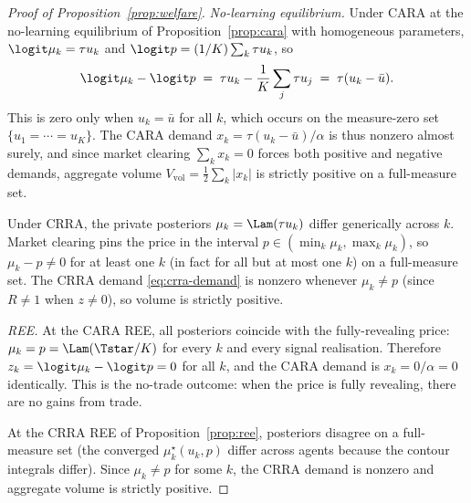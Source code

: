 \begin{proof}[Proof of Proposition~\ref{prop:welfare}]
\emph{No-learning equilibrium.} Under CARA at the no-learning
equilibrium of Proposition~\ref{prop:cara} with homogeneous parameters,
$\logit\mu_{k}=\tau u_{k}$ and $\logit p=(1/K)\sum_{k}\tau u_{k}$, so
\[
   \logit\mu_{k}-\logit p
   \;=\; \tau u_{k} - \frac{1}{K}\sum_{j}\tau u_{j}
   \;=\; \tau(u_{k}-\bar u).
\]
This is zero only when $u_{k}=\bar u$ for all $k$, which occurs on the
measure-zero set $\{u_{1}=\cdots=u_{K}\}$. The CARA demand
$x_{k}=\tau(u_{k}-\bar u)/\alpha$ is thus nonzero almost surely, and
since market clearing $\sum_{k}x_{k}=0$ forces both positive and
negative demands, aggregate volume
$V_{\mathrm{vol}}=\tfrac12\sum_{k}|x_{k}|$ is strictly positive on a
full-measure set.

Under CRRA, the private posteriors $\mu_{k}=\Lam(\tau u_{k})$ differ
generically across $k$. Market clearing pins the price in the interval
$p\in(\min_{k}\mu_{k},\max_{k}\mu_{k})$, so $\mu_{k}-p\neq 0$ for at
least one $k$ (in fact for all but at most one $k$) on a full-measure set.
The CRRA demand \eqref{eq:crra-demand} is nonzero whenever $\mu_{k}\neq p$
(since $R\neq 1$ when $z\neq 0$), so volume is strictly positive.

\emph{REE.} At the CARA REE, all posteriors coincide with the
fully-revealing price: $\mu_{k}=p=\Lam(\Tstar/K)$ for every $k$ and
every signal realisation. Therefore
$z_{k}=\logit\mu_{k}-\logit p=0$ for all $k$, and the CARA demand
is $x_{k}=0/\alpha=0$ identically. This is the \citet{Milgrom1982}
no-trade outcome: when the price is fully revealing, there are no gains
from trade.

At the CRRA REE of Proposition~\ref{prop:ree}, posteriors disagree on
a full-measure set (the converged $\mu_{k}^{\star}(u_{k},p)$ differ
across agents because the contour integrals differ). Since
$\mu_{k}\neq p$ for some $k$, the CRRA demand is nonzero and aggregate
volume is strictly positive.
\end{proof}


